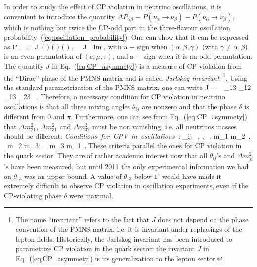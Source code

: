 In order to study the effect of CP violation in neutrino oscillations, it is convenient
to introduce the quantity
$\Delta P_{\alpha \beta} \equiv P (\nu_\alpha \to \nu_\beta) - P (\bar \nu_\alpha \to \bar \nu_\beta)$,
which is nothing but twice the CP-odd part in the three-flavour oscillation
probability~(\ref{eq:oscillation_probability}). One can show that it can be expressed as
%
\be
  \Delta P_{\alpha \beta}\, =\,  J\, \sin \left(  \right)
    \sin \left(  \right) \sin \left(  \right) ,\ \ \quad
    J\, \equiv\, \mbox{Im} \left[ U_{e 1} U^*_{\mu 1} U^*_{e 2} U_{\mu 2} \right] ,
\label{eq:CP_asymmety}
\eeq
%
with a $+$ sign when $(\alpha, \beta, \gamma)$ (with $\gamma \neq \alpha, \beta$)
is an even permutation of $(e, \mu, \tau)$, and a $-$ sign when it is an odd permutation.
The quantity $J$ in Eq.~(\ref{eq:CP_asymmety}) is a measure of CP violation from the
``Dirac'' phase of the PMNS matrix and is called {\it Jarlskog invariant}~\!\footnote{The name
``invariant'' refers to the fact that $J$ does not depend on the phase convention of the PMNS
matrix, i.e. it is invariant under rephasings of the lepton fields. Historically, the Jarlskog
invariant has been introduced to parametrize CP violation in the quark sector;
the invariant $J$ in Eq.~(\ref{eq:CP_asymmety}) is its generalization to the lepton sector.}.
Using the standard parametrization of the PMNS matrix, one can write
%
\be
  J\, =\, \, \cos \theta_{13}  \theta_{12}  \theta_{13}  \theta_{23} \sin \delta\, .
\eeq
%
Therefore, a necessary condition for CP violation in neutrino oscillations
is that all three mixing angles $\theta_{ij}$ are nonzero and that the phase
$\delta$ is different from $0$ and $\pi$.
Furthermore, one can see from Eq.~(\ref{eq:CP_asymmety}) that $\Delta m^2_{21}$,
$\Delta m^2_{31}$ and $\Delta m^2_{32}$ must be non vanishing, i.e. all neutrinos masses
should be different:
%
\bea
  \mbox{\it Conditions for CPV in oscillations :} \qquad
  \theta_{ij} \, , \quad \delta {}, \pi\, , \quad m_1 \neq m_2\, , \ m_2 \neq m_3\, , \ m_3 \neq m_1\, .
\eea
%
These criteria parallel the ones for CP violation in the quark sector.
They are of rather academic interest now that all $\theta_{ij}$'s and
$\Delta m^2_{ji}$'s have been measured, but until 2011 the only
experimental information we had on $\theta_{13}$ was an upper bound.
A value of $\theta_{13}$ below $1^\circ$ would have made it extremely
difficult to observe CP violation in oscillation experiments, even if the CP-violating
phase $\delta$ were maximal.

